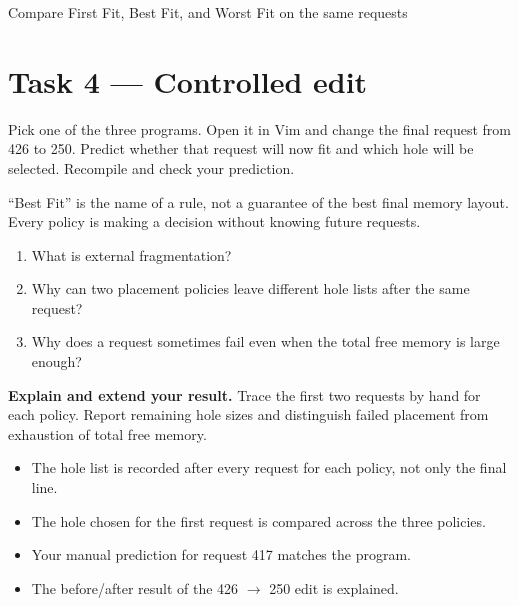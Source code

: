 \begin{labproject}{Compare First Fit, Best Fit, and Worst Fit on the same requests}
\section*{Task 4 --- Controlled edit}
Pick one of the three programs. Open it in Vim and change the final request from 426 to 250. Predict whether that request will now fit and which hole will be selected. Recompile and check your prediction.

\begin{keyidea}
``Best Fit'' is the name of a rule, not a guarantee of the best final memory layout. Every policy is making a decision without knowing future requests.
\end{keyidea}

\begin{quickcheck}
\begin{enumerate}
  \item What is external fragmentation?
  \item Why can two placement policies leave different hole lists after the same request?
  \item Why does a request sometimes fail even when the total free memory is large enough?
\end{enumerate}
\end{quickcheck}

\begin{verification}
\textbf{Explain and extend your result.} Trace the first two requests by hand for each policy. Report remaining hole sizes and distinguish failed placement from exhaustion of total free memory.


\begin{itemize}
  \item The hole list is recorded after every request for each policy, not only the final line.
  \item The hole chosen for the first request is compared across the three policies.
  \item Your manual prediction for request 417 matches the program.
  \item The before/after result of the 426 $\rightarrow$ 250 edit is explained.
\end{itemize}
\end{verification}
\end{labproject}
